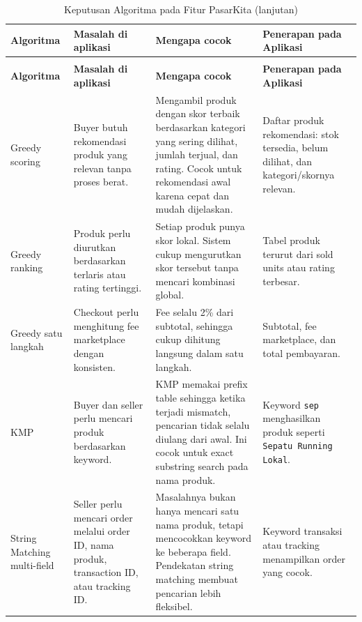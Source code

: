 \begingroup
\scriptsize
\renewcommand{\arraystretch}{1.2}
\setlength{\tabcolsep}{3pt}
\begin{longtable}{@{} >{\raggedright\arraybackslash}p{} >{\raggedright\arraybackslash}p{} >{\raggedright\arraybackslash}p{} >{\raggedright\arraybackslash}p{} @{}}
    \caption{Keputusan Algoritma pada Fitur PasarKita}
    \label{tab:keputusan-algoritma}\\
    \toprule
    \textbf{Algoritma} & \textbf{Masalah di aplikasi} & \textbf{Mengapa cocok} & \textbf{Penerapan pada Aplikasi} \\
    \midrule
    \endfirsthead
    \caption[]{Keputusan Algoritma pada Fitur PasarKita (lanjutan)}\\
    \toprule
    \textbf{Algoritma} & \textbf{Masalah di aplikasi} & \textbf{Mengapa cocok} & \textbf{Penerapan pada Aplikasi} \\
    \midrule
    \endhead
    \bottomrule
    \endfoot
    Greedy scoring & Buyer butuh rekomendasi produk yang relevan tanpa proses berat. & Mengambil produk dengan skor terbaik berdasarkan kategori yang sering dilihat, jumlah terjual, dan rating. Cocok untuk rekomendasi awal karena cepat dan mudah dijelaskan. & Daftar produk rekomendasi: stok tersedia, belum dilihat, dan kategori/skornya relevan. \\
    \addlinespace
    Greedy ranking & Produk perlu diurutkan berdasarkan terlaris atau rating tertinggi. & Setiap produk punya skor lokal. Sistem cukup mengurutkan skor tersebut tanpa mencari kombinasi global. & Tabel produk terurut dari sold units atau rating terbesar. \\
    \addlinespace
    Greedy satu langkah & Checkout perlu menghitung fee marketplace dengan konsisten. & Fee selalu 2\% dari subtotal, sehingga cukup dihitung langsung dalam satu langkah. & Subtotal, fee marketplace, dan total pembayaran. \\
    \addlinespace
    KMP & Buyer dan seller perlu mencari produk berdasarkan keyword. & KMP memakai prefix table sehingga ketika terjadi mismatch, pencarian tidak selalu diulang dari awal. Ini cocok untuk exact substring search pada nama produk. & Keyword \texttt{sep} menghasilkan produk seperti \texttt{Sepatu Running Lokal}. \\
    \addlinespace
    String Matching multi-field & Seller perlu mencari order melalui order ID, nama produk, transaction ID, atau tracking ID. & Masalahnya bukan hanya mencari satu nama produk, tetapi mencocokkan keyword ke beberapa field. Pendekatan string matching membuat pencarian lebih fleksibel. & Keyword transaksi atau tracking menampilkan order yang cocok. \\
\end{longtable}
\endgroup

